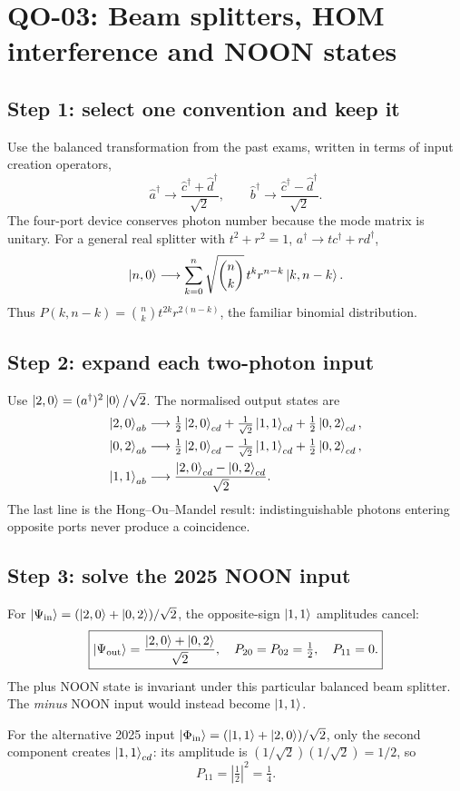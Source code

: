 
\section{QO-03: Beam splitters, HOM interference and NOON states}
\subsection*{Step 1: select one convention and keep it}
Use the balanced transformation from the past exams,
written in terms of input creation operators,
\[
\boxed{\hat a^\dagger\longrightarrow
\frac{\hat c^\dagger+\hat d^\dagger}{\sqrt2},\qquad
\hat b^\dagger\longrightarrow
\frac{\hat c^\dagger-\hat d^\dagger}{\sqrt2}.}
\]
The four-port device conserves photon number because the
mode matrix is unitary. For a general real splitter with
\(t^2+r^2=1\), \(a^\dagger\to t c^\dagger+r d^\dagger\),
\[
\left\lvert n,0\right\rangle\longrightarrow\sum_{k=0}^n
\sqrt{\binom nk}\,t^k r^{n-k}\left\lvert k,n-k\right\rangle.
\]
Thus \(P(k,n-k)=\binom nk t^{2k}r^{2(n-k)}\),
the familiar binomial distribution.

\subsection*{Step 2: expand each two-photon input}
Use \(\left\lvert 2,0\right\rangle=(a^\dagger)^2\left\lvert 0\right\rangle/\sqrt2\).
The normalised output states are
\begin{align*}
\left\lvert 2,0\right\rangle_{ab}&\longrightarrow
\tfrac12\left\lvert 2,0\right\rangle_{cd}
+\tfrac1{\sqrt2}\left\lvert 1,1\right\rangle_{cd}
+\tfrac12\left\lvert 0,2\right\rangle_{cd},\\
\left\lvert 0,2\right\rangle_{ab}&\longrightarrow
\tfrac12\left\lvert 2,0\right\rangle_{cd}
-\tfrac1{\sqrt2}\left\lvert 1,1\right\rangle_{cd}
+\tfrac12\left\lvert 0,2\right\rangle_{cd},\\
\left\lvert 1,1\right\rangle_{ab}&\longrightarrow
\frac{\left\lvert 2,0\right\rangle_{cd}-\left\lvert 0,2\right\rangle_{cd}}{\sqrt2}.
\end{align*}
The last line is the Hong--Ou--Mandel result: indistinguishable
photons entering opposite ports never produce a coincidence.

\subsection*{Step 3: solve the 2025 NOON input}
For \(\left\lvert \Psi_{\rm in}\right\rangle=(\left\lvert 2,0\right\rangle+\left\lvert 0,2\right\rangle)/\sqrt2\),
the opposite-sign \(\left\lvert 1,1\right\rangle\) amplitudes cancel:
\[
\boxed{\left\lvert \Psi_{\rm out}\right\rangle=
\frac{\left\lvert 2,0\right\rangle+\left\lvert 0,2\right\rangle}{\sqrt2},\quad
P_{20}=P_{02}=\tfrac12,\quad P_{11}=0.}
\]
The plus NOON state is invariant under this particular balanced
beam splitter. The \emph{minus} NOON input would instead
become \(\left\lvert 1,1\right\rangle\).

For the alternative 2025 input
\(\left\lvert \Phi_{\rm in}\right\rangle=(\left\lvert 1,1\right\rangle+\left\lvert 2,0\right\rangle)/\sqrt2\),
only the second component creates \(\left\lvert 1,1\right\rangle_{cd}\):
its amplitude is \((1/\sqrt2)(1/\sqrt2)=1/2\), so
\[
\boxed{P_{11}=\left|\tfrac12\right|^2=\tfrac14.}
\]
